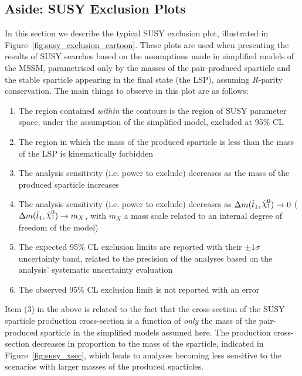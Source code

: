 
\FloatBarrier
\subsection{Aside: SUSY Exclusion Plots}
\label{sec:susy_exclusion_plots}

In this section we describe the typical SUSY exclusion plot, illustrated in Figure~\ref{fig:susy_exclusion_cartoon}.
These plots are used when presenting the results of SUSY searches based on the assumptions
made in simplified models of the MSSM, parametrised only by the masses of the
pair-produced sparticle and the stable sparticle appearing in the final state (the LSP), assuming $R$-parity
conservation. The main things to observe in this plot are as follows:

\begin{enumerate}
    \item The region contained \textit{within} the contours is the region of SUSY parameter space,
        under the assumption of the simplified model, excluded at 95\% CL
    \item The region in which the mass of the produced
        sparticle is less than the mass of the LSP is kinematically forbidden
    \item The analysis sensitivity (i.e. power to exclude) decreases as the mass of the produced sparticle increases
    \item The analysis sensitivity (i.e. power to exclude) decreases as $\sdiff \rightarrow 0$ ($\sdiff \rightarrow m_X$,
        with $m_X$ a mass scale related to an internal degree of freedom of the model)
    \item The expected 95\% CL exclusion limits are reported with their $\pm 1 \sigma$ uncertainty band,
        related to the precision of the analyses based on the analysis' systematic uncertainty evaluation
    \item The observed 95\% CL exclusion limit is not reported with an error
\end{enumerate}

Item (3) in the above is related to the fact that the cross-section of the SUSY sparticle production cross-section
is a function of \textit{only} the mass of the pair-produced sparticle in the simplified models assumed here.
The production cross-section decreases in proportion to the mass of the sparticle, indicated in Figure~\ref{fig:susy_xsec},
which leads to analyses becoming less sensitive to the scenarios with larger masses of the produced sparticles.

